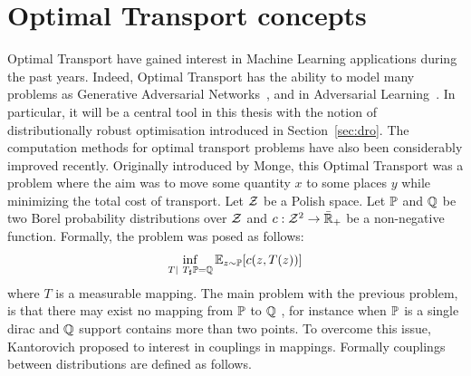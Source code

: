 

\section{Optimal Transport concepts}
Optimal Transport have gained interest in Machine Learning applications during the past years. Indeed, Optimal Transport has the ability to model many problems as Generative Adversarial Networks~\citep{arjovsky2017wasserstein}, and in Adversarial Learning~\citep{sinha2017certifying,pydi2019adversarial,bhagoji2019lower}. In particular, it will be a central tool in this thesis with the notion of distributionally robust optimisation introduced in Section~\ref{sec:dro}. The computation methods for optimal transport problems have also been considerably improved recently. Originally introduced by Monge, this Optimal Transport was a problem where the aim was to move some quantity $x$ to some places $y$ while minimizing the total cost of transport.  Let $\mathcal{Z}$ be a Polish space. Let $\mathbb{P}$ and $\mathbb{Q}$ be two Borel probability distributions over $\mathcal{Z}$ and $c:\mathcal{Z}^2\to\bar{\mathbb{R}}_+$ be a non-negative function. Formally, the problem was posed as follows:
\begin{align*}
    \inf_{T\mid~T_\sharp\PP = \QQ}\mathbb{E}_{z\sim\PP}\left[c(z,T(z))\right]
\end{align*}
where $T$ is a measurable mapping. The main problem with the previous problem, is that there may exist no mapping from $\mathbb{P}$ to $\mathbb{Q}$ , for instance when $\mathbb{P}$ is a single dirac and $\mathbb{Q}$ support contains more than two points. To overcome this issue, Kantorovich proposed to interest in couplings in mappings. Formally couplings between distributions are defined as follows.



